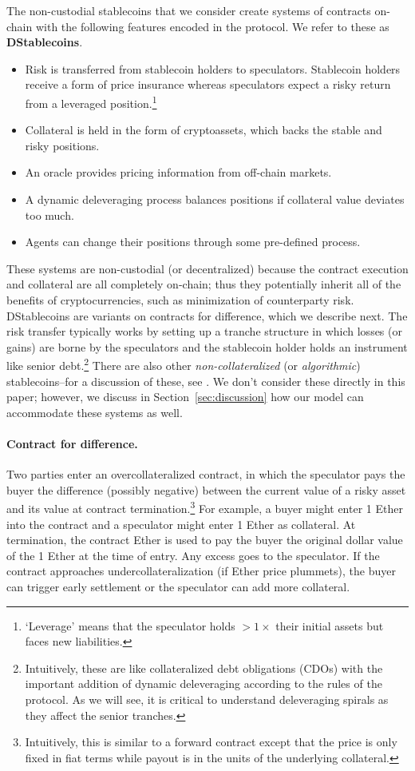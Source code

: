 The non-custodial stablecoins that we consider create systems of contracts on-chain with the following features encoded in the protocol. We refer to these as \textbf{DStablecoins}.
\begin{itemize}
	\item Risk is transferred from stablecoin holders to speculators. Stablecoin holders receive a form of price insurance whereas speculators expect a risky return from a leveraged position.\footnote{`Leverage' means that the speculator holds $>1\times$ their initial assets but faces new liabilities.}
	\item Collateral is held in the form of cryptoassets, which backs the stable and risky positions.
	\item An oracle provides pricing information from off-chain markets.
	\item A dynamic deleveraging process balances positions if collateral value deviates too much.
	\item Agents can change their positions through some pre-defined process.
\end{itemize}
These systems are non-custodial (or decentralized) because the contract execution and collateral are all completely on-chain; thus they potentially inherit all of the benefits of cryptocurrencies, such as minimization of counterparty risk. DStablecoins are variants on contracts for difference, which we describe next. The risk transfer typically works by setting up a tranche structure in which losses (or gains) are borne by the speculators and the stablecoin holder holds an instrument like senior debt.\footnote{Intuitively, these are like collateralized debt obligations (CDOs) with the important addition of dynamic deleveraging according to the rules of the protocol. As we will see, it is critical to understand deleveraging spirals as they affect the senior tranches.} There are also other \emph{non-collateralized} (or \emph{algorithmic}) stablecoins--for a discussion of these, see \cite{blockchain2019}. We don't consider these directly in this paper; however, we discuss in Section~\ref{sec:discussion} how our model can accommodate these systems as well.



\paragraph{Contract for difference.} Two parties enter an overcollateralized contract, in which the speculator pays the buyer the difference (possibly negative) between the current value of a risky asset and its value at contract termination.\footnote{Intuitively, this is similar to a forward contract except that the price is only fixed in fiat terms while payout is in the units of the underlying collateral.} For example, a buyer might enter 1 Ether into the contract and a speculator might enter 1 Ether as collateral. At termination, the contract Ether is used to pay the buyer the original dollar value of the 1 Ether at the time of entry. Any excess goes to the speculator. If the contract approaches undercollateralization (if Ether price plummets), the buyer can trigger early settlement or the speculator can add more collateral.


